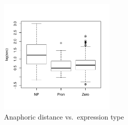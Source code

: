 \begin{figure}
	\begin{center}
	\includegraphics[width=0.5\textwidth]{figure/DistExpType.pdf}
	\caption{Anaphoric distance vs.\ expression type}
	\label{DistExpTypeF}
	\end{center}
\end{figure}


